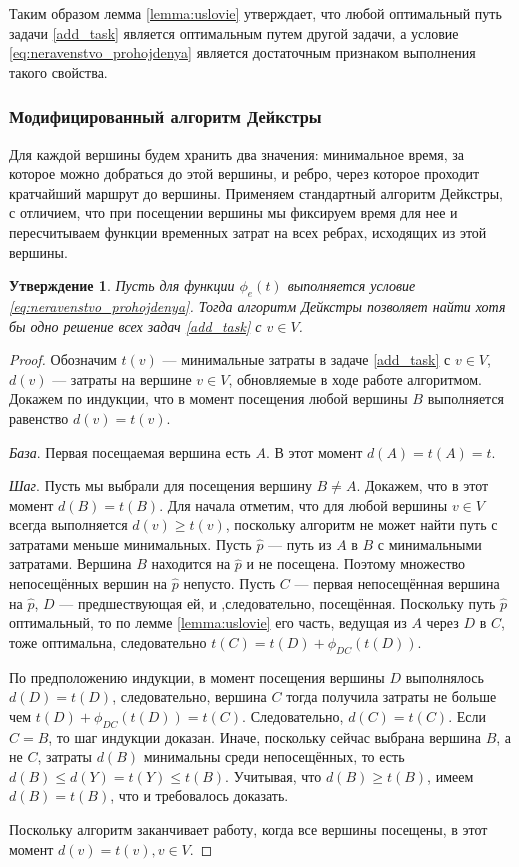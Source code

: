 \documentclass[12pt, a4paper]{article}
\newtheorem{state}{Утверждение}[section]
\begin{document}
	Таким образом лемма \ref{lemma:uslovie} утверждает, что любой оптимальный путь задачи  \eqref{add_task} является оптимальным путем другой задачи, а условие \eqref{eq:neravenstvo_prohojdenya} является достаточным признаком выполнения такого свойства.
	
	\subsubsection{Модифицированный алгоритм Дейкстры}
	
	Для каждой вершины будем хранить два значения: минимальное время, за которое можно добраться до этой вершины, и ребро, через которое проходит кратчайший маршрут до вершины.
	Применяем стандартный алгоритм Дейкстры, с отличием, что при посещении вершины мы фиксируем время для нее и пересчитываем функции временных затрат на всех ребрах, исходящих из этой вершины.
	
	\begin{state}
		Пусть для функции $\phi_e(t)$ выполняется условие \eqref{eq:neravenstvo_prohojdenya}. Тогда алгоритм Дейкстры позволяет найти хотя бы одно решение всех задач \eqref{add_task} с $v \in V$.
	\end{state}
	
	\begin{proof}
		Обозначим $t(v)$ --- минимальные затраты в задаче \eqref{add_task} с $v \in V$, $d(v)$ --- затраты на вершине $v \in V$, обновляемые в ходе работе алгоритмом. Докажем по индукции, что в момент посещения любой вершины $B$ выполняется равенство  $d(v) = t(v)$.
		
		\textit{База}. Первая посещаемая вершина есть $A$. В этот момент $d(A) = t(A) = t$.
		
		\textit{Шаг}. Пусть мы выбрали для посещения вершину $B \ne A$. Докажем, что в этот момент $d(B) = t(B)$. Для начала отметим, что для любой вершины $v \in V$ всегда выполняется $d(v)\ge t(v)$, поскольку алгоритм не может найти путь с затратами меньше минимальных. Пусть $\widehat{p}$ — путь из $A$ в $B$ с минимальными затратами. Вершина $B$ находится на $\widehat{p}$ и не посещена. Поэтому множество непосещённых вершин на $\widehat{p}$ непусто. Пусть $C$ --- первая непосещённая вершина на $\widehat{p}$, $D$ --- предшествующая ей, и ,следовательно, посещённая. Поскольку путь $\widehat{p}$ оптимальный, то по лемме \ref{lemma:uslovie} его часть, ведущая из $A$ через $D$ в $C$, тоже оптимальна, следовательно $t(C) = t(D) + \phi_{DC}(t(D))$.
		
		По предположению индукции, в момент посещения вершины $D$ выполнялось $d(D) = t(D)$, следовательно, вершина $C$ тогда получила затраты не больше чем $t(D) + \phi_{DC}(t(D)) = t(C)$. Следовательно, $d(C) = t(C)$. Если $C = B$, то шаг индукции доказан. Иначе, поскольку сейчас выбрана вершина $B$, а не $C$, затраты $d(B)$ минимальны среди непосещённых, то есть $d(B) \le d(Y) = t(Y) \le t(B)$. Учитывая, что $d(B) \ge t(B)$, имеем $d(B) = t(B)$, что и требовалось доказать.
		
		Поскольку алгоритм заканчивает работу, когда все вершины посещены, в этот момент $d(v) = t(v), v \in V$.
	\end{proof}
\end{document}
